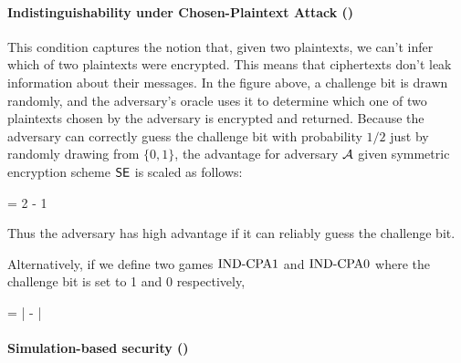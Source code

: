 \paragraph{Indistinguishability under Chosen-Plaintext Attack (\INDCPA)}



This condition captures the notion that, given two plaintexts, we can't infer
which of two plaintexts were encrypted. This means that ciphertexts don't leak
information about their messages. In the figure above, a challenge bit is
drawn randomly, and the adversary's oracle uses it to determine which one
of two plaintexts chosen by the adversary is encrypted and returned.
Because the adversary can correctly guess the challenge bit with probability
$1/2$ just by randomly drawing from $\{0,1\}$, 
the advantage for adversary ${\mathcal A}$ given symmetric encryption scheme
$\textnormal{\textsf{SE}}$  is scaled as follows:

\bnm
\AdvINDCPA{\SE}{\advA} = 2\cdotsm\Prob{\INDCPA_\SE^\advA\Rightarrow\true} - 1
\enm

Thus the adversary has high advantage if it can reliably guess the challenge
bit.

Alternatively, if we define two games $\textnormal{IND-CPA}1$ and $\textnormal{IND-CPA}0$ where the
challenge bit is set to 1 and 0 respectively, 

\bnm
\AdvINDCPA{\SE}{\advA} = 
    \left| -  \right| 
\enm

\paragraph{Simulation-based security (\INDSIM)}



